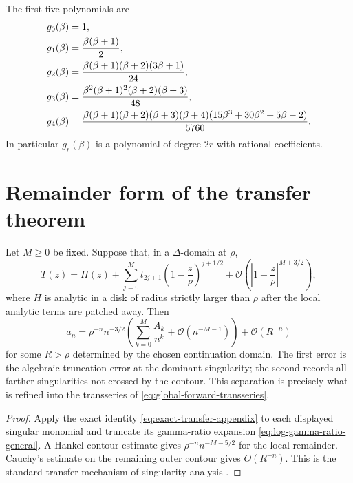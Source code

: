 \documentclass[11pt,a4paper,oneside,openany]{book}
\theoremstyle{definition}
\theoremstyle{remark}
\newcommand{\bigO}{\mathcal O}
\begin{document}
The first five polynomials are
\begin{align}
 g_0(\beta)={}&1,\notag\\
 g_1(\beta)={}&\frac{\beta(\beta+1)}2,\notag\\
 g_2(\beta)={}&
 \frac{\beta(\beta+1)(\beta+2)(3\beta+1)}{24},\notag\\
 g_3(\beta)={}&
 \frac{\beta^2(\beta+1)^2(\beta+2)(\beta+3)}{48},\notag\\
 g_4(\beta)={}&
 \frac{\beta(\beta+1)(\beta+2)(\beta+3)(\beta+4)
 (15\beta^3+30\beta^2+5\beta-2)}{5760}.
 \label{eq:g-first-five}
\end{align}
In particular $g_r(\beta)$ is a polynomial of degree $2r$ with rational
coefficients.

\section{Remainder form of the transfer theorem}
Let $M\ge0$ be fixed.  Suppose that, in a $\Delta$-domain at $\rho$,
\begin{equation}
 T(z)=H(z)+\sum_{j=0}^{M}t_{2j+1}
 \left(1-\frac z\rho\right)^{j+1/2}
 +\bigO\!\left(\left|1-\frac z\rho\right|^{M+3/2}\right),
 \label{eq:transfer-remainder-hyp}
\end{equation}
where $H$ is analytic in a disk of radius strictly larger than $\rho$ after the
local analytic terms are patched away.  Then
\begin{equation}
 a_n=\rho^{-n}n^{-3/2}
 \left(\sum_{k=0}^{M}\frac{A_k}{n^k}
 +\bigO(n^{-M-1})\right)
 +\bigO(R^{-n})
 \label{eq:transfer-remainder-conclusion}
\end{equation}
for some $R>\rho$ determined by the chosen continuation domain.  The first
error is the algebraic truncation error at the dominant singularity; the
second records all farther singularities not crossed by the contour.  This
separation is precisely what is refined into the transseries of
\cref{eq:global-forward-transseries}.

\begin{proof}
Apply the exact identity \cref{eq:exact-transfer-appendix} to each displayed
singular monomial and truncate its gamma-ratio expansion
\cref{eq:log-gamma-ratio-general}.  A Hankel-contour estimate gives
$\rho^{-n}n^{-M-5/2}$ for the local remainder.  Cauchy's estimate on the
remaining outer contour gives $O(R^{-n})$.  This is the standard transfer
mechanism of singularity analysis \cite{FlajoletOdlyzko1990,FlajoletSedgewick2009}.
\end{proof}
\end{document}
